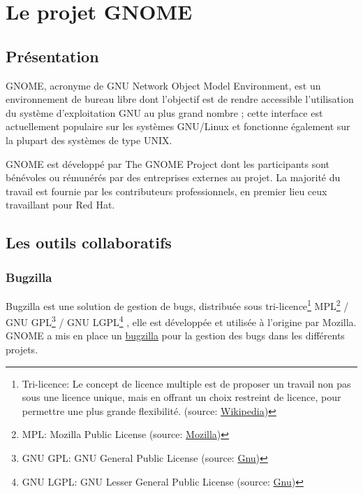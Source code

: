 \documentclass[12pt]{report}
\begin{document}
\chapter{Le projet GNOME}
\section{Présentation}
GNOME, acronyme de GNU Network Object Model Environment, est un
environnement de bureau libre  dont l'objectif est de rendre
accessible l'utilisation du système d'exploitation GNU au plus grand
nombre ; cette interface est actuellement populaire sur les systèmes
GNU/Linux et fonctionne également sur la plupart des systèmes de type
UNIX.

GNOME est développé par The GNOME Project dont les participants sont
bénévoles ou rémunérés par des entreprises externes au projet. La
majorité du travail est fournie par les contributeurs professionnels,
en premier lieu ceux travaillant pour Red Hat.

\section{Les outils collaboratifs} 
\subsection{Bugzilla}
\label{bugzilla}
Bugzilla est une solution de gestion de bugs, distribuée sous
tri-licence\footnote{Tri-licence: Le concept de licence multiple
  est de proposer un travail non pas sous une licence unique, mais
  en offrant un choix restreint de licence, pour permettre une plus
  grande flexibilité. (source:
  \href{https://fr.wikipedia.org/wiki/Licence_multiple}{Wikipedia})}
MPL\footnote{MPL: Mozilla Public License (source:
  \href{https://www.mozilla.org/en-US/MPL/}{Mozilla})}
/ GNU GPL\footnote{GNU GPL: GNU General Public License (source:
  \href{https://www.gnu.org/licenses/gpl.html}{Gnu})}
/ GNU LGPL\footnote{GNU LGPL: GNU Lesser General Public License (source:
  \href{https://www.gnu.org/licenses/lgpl.html}{Gnu})}
, elle est développée et utilisée à l'origine par Mozilla.
GNOME a mis en place un \href{https://bugzilla.gnome.org}{bugzilla} pour 
la gestion des bugs dans les différents projets.
\end{document}
